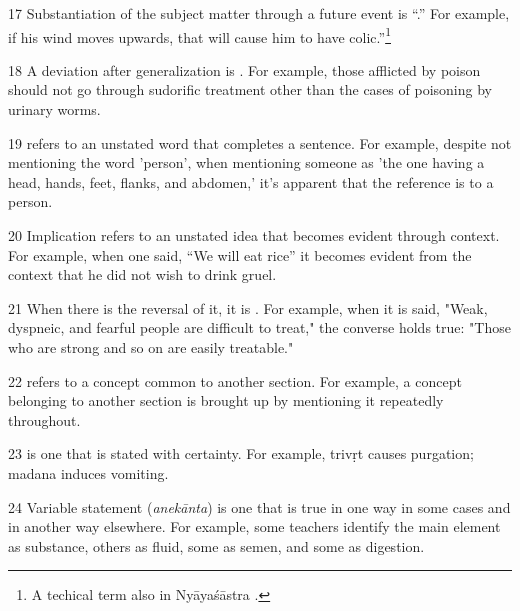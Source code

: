 \begin{translation}
\item [17] Substantiation of the subject matter through a future event is
“.” For example, if his wind moves upwards, that
will cause him to have colic.”\footnote{A techical term also in
    Nyāyaśāstra \citep[6--7]{jhal-1978}.}


\item [18] A deviation after generalization is . For example, those afflicted by poison should not go through sudorific treatment other than the cases of poisoning by urinary worms.

\item [19]  refers to an 
unstated word that 
completes a sentence. For example, despite not mentioning the word 'person',
when mentioning someone as 'the one having a head, hands, feet, flanks, and 
abdomen,' it's apparent that the reference is to a person. 

\item [20] Implication refers to an unstated idea 
that becomes evident through context. For example, when one said, “We will 
eat rice” it becomes evident from the context that he did not wish to drink 
gruel. 

\item [21] When there is the reversal of it, it is . 
For example, when it is said, "Weak, dyspneic, and fearful people are difficult to 
treat," the converse holds true: "Those who are strong and so on are easily 
treatable." 

\item [22]  refers to a concept common to another section. For example, a concept belonging to another section is brought up by mentioning it repeatedly throughout. 

\item [23]  is one that 
is stated with certainty. For example, \gls{trivṛt} causes purgation; 
\gls{madana} induces vomiting.

\item [24] Variable statement (\emph{anekānta}) is one that is true in one way in 
some cases and in another way elsewhere. For example, some teachers identify 
the main element as substance, others as fluid, some as semen, and some as 
digestion.


\end{translation}
